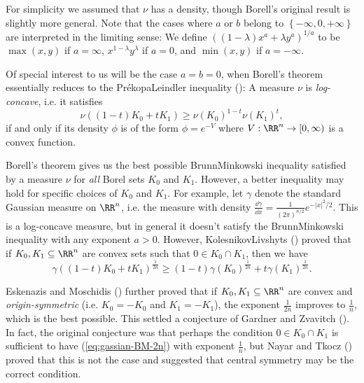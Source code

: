 For simplicity we assumed that $\nu$ has a density, though Borell's original result is slightly more general. Note that the cases where $a$ or
$b$ belong to $\left\{ -\infty,0,+\infty\right\} $ are interpreted
in the limiting sense: We define $\left((1-\lambda)x^{a}+\lambda y^{a}\right)^{1/a}$
to be $\max(x,y)$ if $a=\infty$, $x^{1-\lambda}y^{\lambda}$ if
$a=0$, and $\min(x,y)$ if $a=-\infty$. 

Of special interest to us will be the case $a=b=0$, when Borell's
theorem essentially reduces to the Prékopa\textendash Leindler inequality (\cite{Prekopa71, Leindler72}):
A measure $\nu$ is \emph{log-concave}, i.e. it satisfies 
\begin{equation}
\nu\left((1-t)K_{0}+t K_{1}\right)\ge\nu(K_{0})^{1-t}\nu(K_{1})^{t},
\end{equation}
 if and only if its density $\phi$ is of the form $\phi=e^{-V}$
where $V:\RR^{n}\to[0,\infty)$ is a convex function.

Borell's theorem gives us the best possible Brunn\textendash Minkowski
inequality satisfied by a measure $\nu$ for \emph{all} Borel sets
$K_{0}$ and $K_{1}$. However, a better inequality may hold for specific
choices of $K_{0}$ and $K_{1}$. For example, let $\gamma$ denote the standard
Gaussian measure on $\RR^{n}$, i.e. the measure with density $\frac{\dd\gamma}{\dd x}=\frac{1}{\left(2\pi\right)^{n/2}}e^{-\left|x\right|^{2}/2}$.
This is a log-concave measure, but in general it doesn't satisfy the
Brunn\textendash Minkowski inequality with any exponent $a>0$. However,
Kolesnikov\textendash Livshyts (\cite{KolesnikovLivshyts21}) proved that
if $K_{0},K_{1}\subseteq\RR^{n}$ are convex sets such that $0\in K_{0}\cap K_{1}$,
then we have 
\begin{equation} 
\gamma\left((1-t)K_{0} + t K_{1}\right)^{\frac{1}{2n}}\ge(1-t)\gamma(K_{0})^{\frac{1}{2n}}+t \gamma(K_{1})^{\frac{1}{2n}}.\label{eq:gassian-BM-2n}
\end{equation}

Eskenazis and Moschidis (\cite{EskenazisMoschidis21}) further proved that if $K_{0},K_{1}\subseteq\RR^{n}$
are convex and \emph{origin-symmetric} (i.e. $K_{0}=-K_{0}$ and $K_{1}=-K_{1}$),
the exponent $\frac{1}{2n}$ improves to $\frac{1}{n}$, which is
the best possible. This settled a conjecture of Gardner and Zvavitch
(\cite{GardnerZvavitch10}). In fact, the original conjecture was that perhaps
the condition $0\in K_{0}\cap K_{1}$ is sufficient to have (\eqref{eq:gassian-BM-2n})
with exponent $\frac{1}{n}$, but Nayar and Tkocz (\cite{NayarTkocz13})
proved that this is not the case and suggested that central symmetry
may be the correct condition.

